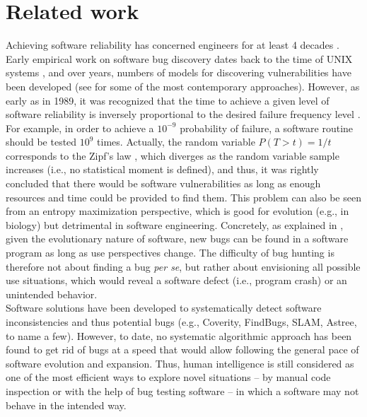 \section{Related work}
\label{sec:related}
Achieving software reliability has concerned engineers for at least 4 decades \cite{littlewood1973bayesian,adams1984textordfeminineoptimizing,littlewood1989predicting}. Early empirical work on software bug discovery dates back to the time of UNIX systems \cite{miller1990empirical}, and over years, numbers of models for discovering vulnerabilities have been developed (see \cite{avgerinos2014enhancing,zhao2016empirical} for some of the most contemporary approaches). However, as early as in 1989, it was recognized that the time to achieve a given level of software reliability is inversely proportional to the desired failure frequency level \cite{adams1984textordfeminineoptimizing}. For example, in order to achieve a $10^{-9}$ probability of failure, a software routine should be tested  $10^{9}$ times. Actually, the random variable $P(T > t) = 1/t$ corresponds to the Zipf's law \cite{maillart2008empirical,saichev2009theory}, which diverges as the random variable sample increases (i.e., no statistical moment is defined), and thus, it was rightly concluded that there would be software vulnerabilities as long as enough resources and time could be provided to find them. This problem can also be seen from an entropy maximization perspective, which is good for evolution (e.g., in biology) but detrimental in software engineering. Concretely, as explained in \cite{brady1999murphy}, given the evolutionary nature of software, new bugs can be found in a software program as long as use perspectives change. The difficulty of bug hunting is therefore not about finding a bug {\it per se}, but rather about envisioning all possible use situations, which would reveal a software defect (i.e., program crash) or an unintended behavior.\\

Software solutions have been developed to systematically detect software inconsistencies and thus potential bugs (e.g., Coverity, FindBugs, SLAM, Astree, to name a few). However, to date, no systematic algorithmic approach has been found to get rid of bugs at a speed that would allow following the general pace of software evolution and expansion. Thus, human intelligence is still considered as one of the most efficient ways to explore novel situations -- by manual code inspection or with the help of bug testing software -- in which a software may not behave in the intended way.\\


